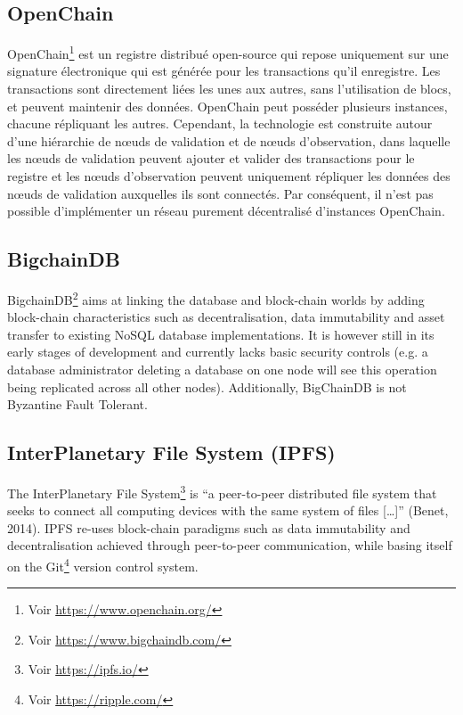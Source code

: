 \documentclass{tnreport}
\begin{document}
\subsection{OpenChain}

OpenChain\footnote{Voir \url{https://www.openchain.org/}} est un registre distribué open-source qui repose uniquement sur une signature électronique qui est générée pour les transactions qu'il enregistre. Les transactions sont directement liées les unes aux autres, sans l'utilisation de blocs, et peuvent maintenir des données. OpenChain peut posséder plusieurs instances, chacune répliquant les autres. Cependant, la technologie est construite autour d'une hiérarchie de nœuds de validation et de nœuds d'observation, dans laquelle les nœuds de validation peuvent ajouter et valider des transactions pour le registre et les nœuds d'observation peuvent uniquement répliquer les données des nœuds de validation auxquelles ils sont connectés. Par conséquent, il n'est pas possible d'implémenter un réseau purement décentralisé d'instances OpenChain.

\subsection{BigchainDB}

BigchainDB\footnote{Voir \url{https://www.bigchaindb.com/}} aims at linking the database and block-chain worlds by adding block-chain characteristics such as decentralisation, data immutability and asset transfer to existing NoSQL database implementations.
It is however still in its early stages of development and currently lacks basic security controls (e.g. a database administrator deleting a database on one node will see this operation being replicated across all other nodes). Additionally, BigChainDB is not Byzantine Fault Tolerant.

\subsection{InterPlanetary File System (IPFS)}

The InterPlanetary File System\footnote{Voir \url{https://ipfs.io/}} is “a peer-to-peer distributed file system that seeks to connect all computing devices with the same system of files […]” (Benet, 2014).
IPFS re-uses block-chain paradigms such as data immutability and decentralisation achieved through peer-to-peer communication, while basing itself on the Git\footnote{Voir \url{https://ripple.com/}} version control system.
\end{document}
